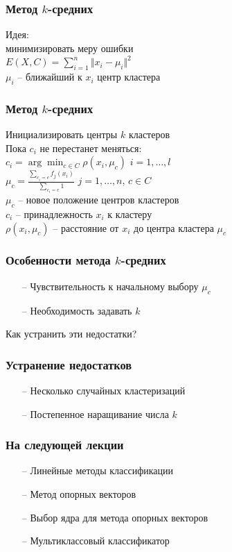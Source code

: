 \documentclass[12pt]{beamer}
\begin{document}
\begin{frame}\frametitle{Метод $k$-средних}
Идея:\\  минимизировать меру ошибки\\
\vspace{5mm}${E(X, C) = \sum_{i = 1}^n \Vert x_i -\mu_i \Vert^2}$\\
\vspace{5mm}
$\mu_i$ -- ближайший к $x_i$ центр кластера
\end{frame}

\begin{frame}\frametitle{Метод $k$-средних}
Инициализировать центры $k$ кластеров \\
\vspace{2mm}
Пока $c_i$ не перестанет меняться:\\
\hspace{5mm} $c_i = \arg\min_{c \in C} \rho(x_i, \mu_c)$ \hspace{5mm} $i = 1,\dots, l$\\
\vspace{2mm}\hspace{5mm} ${\mu_c = \frac{\sum_{c_i = c} f_j(x_i)}{\sum_{c_i = c} 1} }$ \hspace{10mm} $j = 1,\dots, n$, $c \in C$\\
\vspace{2mm}
$\mu_c$ -- новое положение центров кластеров\\
$c_i$ -- принадлежность $x_i$ к кластеру\\
$\rho(x_i, \mu_c)$ -- расстояние от $x_i$ до центра кластера $\mu_c$
\end{frame}

\begin{frame}\frametitle{Особенности метода $k$-средних}
\begin{itemize}
\item[--] Чувствительность к начальному выбору $\mu_c$
\item[--] Необходимость задавать $k$
\end{itemize}
Как устранить эти недостатки?
\end{frame}

\begin{frame}\frametitle{Устранение недостатков}
\begin{itemize}
\item[--] Несколько случайных кластеризаций
\item[--] Постепенное наращивание числа $k$
\end{itemize}
\end{frame}

\begin{frame}\frametitle{На следующей лекции}
\begin{itemize}
\item[--] Линейные методы классификации
\item[--] Метод опорных векторов
\item[--] Выбор ядра для метода опорных векторов
\item[--] Мультиклассовый классификатор
\end{itemize}
\end{frame}
\end{document}
